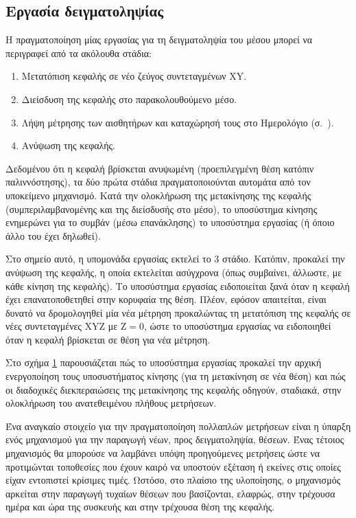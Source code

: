 \subsection{Εργασία δειγματοληψίας}

Η πραγματοποίηση μίας εργασίας για τη δειγματοληψία του μέσου μπορεί να
περιγραφεί από τα ακόλουθα στάδια:
\begin{enumerate}
    \item Μετατόπιση κεφαλής σε νέο ζεύγος συντεταγμένων XY.
    \item Διείσδυση της κεφαλής στο παρακολουθούμενο μέσο.
    \item Λήψη μέτρησης των αισθητήρων και καταχώρησή τους στο Ημερολόγιο
    (σ.~\pageref{sec:log}).
    \item Ανύψωση της κεφαλής.
\end{enumerate}

Δεδομένου ότι η κεφαλή βρίσκεται ανυψωμένη (προεπιλεγμένη θέση κατόπιν
παλιννόστησης), %
τα δύο πρώτα στάδια πραγματοποιούνται αυτομάτα από τον
υποκείμενο μηχανισμό. Κατά την ολοκλήρωση της μετακίνησης της κεφαλής
(συμπεριλαμβανομένης και της διείσδυσής στο μέσο), το υποσύστημα κίνησης
ενημερώνει για το συμβάν (μέσω επανάκλησης) το υποσύστημα εργασίας (ή όποιο άλλο
του έχει δηλωθεί).

Στο σημείο αυτό, η υπομονάδα εργασίας εκτελεί το 3 στάδιο. Κατόπιν,
προκαλεί την ανύψωση της κεφαλής, η οποία εκτελείται ασύγχρονα (όπως συμβαίνει,
άλλωστε, με κάθε κίνηση της κεφαλής). Το υποσύστημα εργασίας ειδοποιείται ξανά
όταν η κεφαλή έχει επανατοποθετηθεί στην κορυφαία της θέση. Πλέον, εφόσον
απαιτείται, είναι δυνατό να δρομολογηθεί μία νέα μέτρηση προκαλώντας τη
μετατόπιση της κεφαλής σε νέες συντεταγμένες XYZ με $\text{Z} = 0$, ώστε το
υποσύστημα εργασίας να ειδοποιηθεί όταν η κεφαλή βρίσκεται σε θέση για νέα
μέτρηση.

Στο σχήμα \ref{fig:task:samples} παρουσιάζεται πώς το υποσύστημα εργασίας
προκαλεί την αρχική ενεργοποίηση τους υποσυστήματος κίνησης (για τη μετακίνηση
σε νέα θέση) και πώς οι διαδοχικές διεκπεραιώσεις της μετακίνησης της κεφαλής
οδηγούν, σταδιακά, στην ολοκλήρωση του ανατεθειμένου πλήθους μετρήσεων.

\begin{figure}
    \caption{
    \label{fig:task:samples}}
\end{figure}

Ένα αναγκαίο στοιχείο για την πραγματοποίηση πολλαπλών μετρήσεων είναι η ύπαρξη
ενός μηχανισμού για την παραγωγή νέων, προς δειγματοληψία, θέσεων. Ένας τέτοιος
μηχανισμός θα μπορούσε να λαμβάνει υπόψη προηγούμενες μετρήσεις ώστε να
προτιμώνται τοποθεσίες που έχουν καιρό να υποστούν εξέταση ή εκείνες στις οποίες
είχαν εντοπιστεί κρίσιμες τιμές. Ωστόσο, στο πλαίσιο της υλοποίησης, ο
μηχανισμός αρκείται στην παραγωγή τυχαίων θέσεων που βασίζονται, ελαφρώς, στην
τρέχουσα ημέρα και ώρα της συσκευής
και στην τρέχουσα θέση της κεφαλής.


